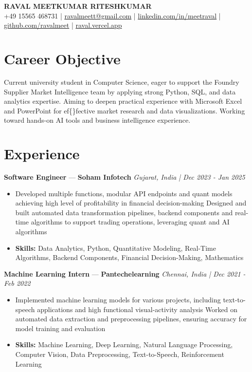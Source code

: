 \documentclass[a4paper,10pt]{article}
\begin{document}
\begin{center}
  {\Large\bfseries RAVAL MEETKUMAR RITESHKUMAR}\\[2pt]
  {\small +49 15565 468731 \;|\; \href{mailto:ravalmeett@gmail.com}{ravalmeett@gmail.com} \;|\; \href{https://www.linkedin.com/in/meetraval/}{linkedin.com/in/meetraval} \;|\; \href{https://github.com/ravalmeet}{github.com/ravalmeet} \;|\; \href{https://raval.vercel.app/}{raval.vercel.app}}
\end{center}
\vspace{-3pt}

\section*{Career Objective}
Current university student in Computer Science, eager to support the Foundry Supplier Market Intelligence team by applying strong Python, SQL, and data analytics expertise. Aiming to deepen practical experience with Microsoft Excel and PowerPoint for ef\{\}fective market research and data visualizations. Working toward hands-on AI tools and business intelligence experience.\par

\section*{Experience}
\textbf{Software Engineer} — \textbf{Soham Infotech} \hfill \textit{Gujarat, India \;|\; Dec 2023 - Jan 2025}\par
\vspace{1pt}
\begin{itemize}
  \item Developed multiple functions, modular API endpoints and quant models achieving high level of profitability in financial decision-making Designed and built automated data transformation pipelines, backend components and real-time algorithms to support trading operations, leveraging quant and AI algorithms
  \item \textbf{Skills:} Data Analytics, Python, Quantitative Modeling, Real-Time Algorithms, Backend Components, Financial Decision-Making, Mathematics
\end{itemize}
\vspace{3pt}
\textbf{Machine Learning Intern} — \textbf{Pantechelearning} \hfill \textit{Chennai, India \;|\; Dec 2021 - Feb 2022}\par
\vspace{1pt}
\begin{itemize}
  \item Implemented machine learning models for various projects, including text-to-speech applications and high functional visual-activity analysis Worked on automated data extraction and preprocessing pipelines, ensuring accuracy for model training and evaluation
  \item \textbf{Skills:} Machine Learning, Deep Learning, Natural Language Processing, Computer Vision, Data Preprocessing, Text-to-Speech, Reinforcement Learning
\end{itemize}
\end{document}
